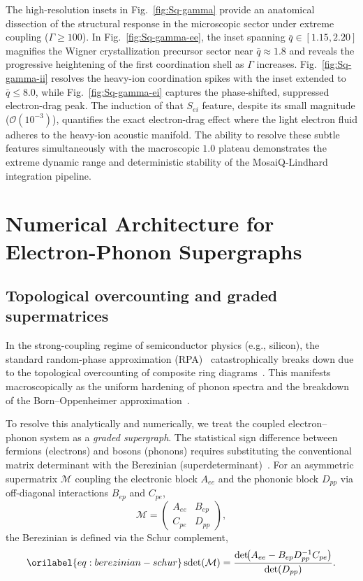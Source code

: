 \documentclass[aps,showkeys,noshowpacs,superscriptaddress,pre,preprint]{revtex4-2}
\let\label\orilabel
\begin{document}
The high-resolution insets in Fig.~\ref{fig:Sq-gamma} provide an anatomical dissection of the structural response in the microscopic sector under extreme coupling ($\Gamma \ge 100$).
In Fig.~\ref{fig:Sq-gamma-ee}, the inset spanning $\bar{q} \in [1.15, 2.20]$ magnifies the Wigner crystallization precursor sector near $\bar{q} \approx 1.8$ and reveals the progressive heightening of the first coordination shell as $\Gamma$ increases.
Fig.~\ref{fig:Sq-gamma-ii} resolves the heavy-ion coordination spikes with the inset extended to $\bar{q} \le 8.0$, while Fig.~\ref{fig:Sq-gamma-ei} captures the phase-shifted, suppressed electron-drag peak.
The induction of that $S_{ei}$ feature, despite its small magnitude ($\mathcal{O}(10^{-3})$), quantifies the exact electron-drag effect where the light electron fluid adheres to the heavy-ion acoustic manifold.
The ability to resolve these subtle features simultaneously with the macroscopic $1.0$ plateau demonstrates the extreme dynamic range and deterministic stability of the MosaiQ-Lindhard integration pipeline.

\section{Numerical Architecture for Electron-Phonon Supergraphs}
\label{sec:berezinian_numerics}

\subsection{Topological overcounting and graded supermatrices}
In the strong-coupling regime of semiconductor physics (e.g., silicon), the standard random-phase approximation (RPA)~\cite{RPA} catastrophically breaks down due to the topological overcounting of composite ring diagrams~\cite{Fetter-Walecka1971,Holstein1959}.
This manifests macroscopically as the uniform hardening of phonon spectra and the breakdown of the Born--Oppenheimer approximation~\cite{Ashcroft-Mermin1976}.

To resolve this analytically and numerically, we treat the coupled electron--phonon system as a \textit{graded supergraph}.
The statistical sign difference between fermions (electrons) and bosons (phonons) requires substituting the conventional matrix determinant with the Berezinian (superdeterminant)~\cite{Berezin1987,DeWitt1992}.
For an asymmetric supermatrix $\mathcal{M}$ coupling the electronic block $A_{ee}$ and the phononic block $D_{pp}$ via off-diagonal interactions $B_{ep}$ and $C_{pe}$,
\begin{equation}
\mathcal{M}
=
\begin{pmatrix}
A_{ee} & B_{ep} \\
C_{pe} & D_{pp}
\end{pmatrix},
\end{equation}
the Berezinian is defined via the Schur complement,
\begin{equation}
\label{eq:berezinian-schur}
\operatorname{sdet}(\mathcal{M})
=
\frac{\det\!\bigl(A_{ee} - B_{ep} D_{pp}^{-1} C_{pe}\bigr)}{\det(D_{pp})}.
\end{equation}
\end{document}
